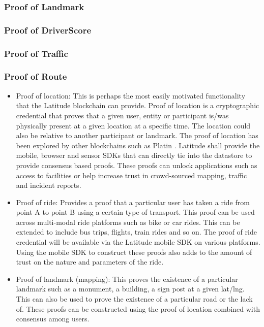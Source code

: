 \subsubsection{Proof of Landmark}
\subsubsection{Proof of DriverScore}
\subsubsection{Proof of Traffic}
\subsubsection{Proof of Route}

 \begin{itemize}
     \item Proof of location: This is perhaps the most easily motivated functionality that the Latitude blockchain can
         provide. Proof of location is a cryptographic credential that proves that a given user, entity or participant
         is/was physically present at a given location at a specific time. The location could also be relative to
         another participant or landmark. The proof of location
         has been explored by other blockchains such as Platin \cite{platin}. Latitude shall provide the mobile, browser
         and sensor SDKs that can directly tie into the datastore to provide consensus based proofs. These proofs can
         unlock applications such as access to facilities or help increase trust in crowd-sourced mapping, traffic and incident
         reports.
     \item Proof of ride: Provides a proof that a particular user has taken a ride from point A to point B using a
         certain type of transport. This proof can be used across multi-modal ride platforms such as bike or car rides.
         This can be extended to include bus trips, flights, train rides and so on. The proof of ride credential will be
         available via the Latitude mobile SDK on various platforms. Using the mobile SDK to construct these proofs also
         adds to the amount of trust on the nature and parameters of the ride.
     \item Proof of landmark (mapping): This proves the existence of a particular landmark such as a monument, a
         building, a sign post at a given lat/lng. This can also be used to prove the existence of a particular road or
         the lack of. These proofs can be constructed using the proof of location combined with consensus among users.

\end{itemize}
